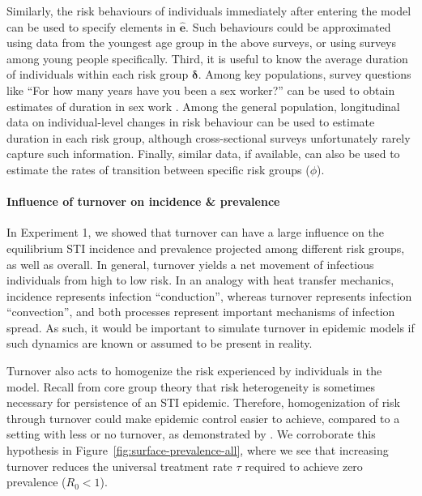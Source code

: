 Similarly, the risk behaviours of individuals immediately after entering the model
can be used to specify elements in $\bm{\hat{e}}$.
Such behaviours could be approximated using data from the youngest age group
in the above surveys,
or using surveys among young people specifically.
Third, it is useful to know the average duration of individuals within each risk group $\bm{\delta}$.
Among key populations, survey questions like
``For how many years have you been a sex worker?''
can be used to obtain estimates of duration in sex work \citep{Watts2010}.
Among the general population,
longitudinal data on individual-level changes in risk behaviour
can be used to estimate duration in each risk group,
although cross-sectional surveys unfortunately rarely capture such information.
Finally, similar data, if available, can also be used to estimate
the rates of transition between specific risk groups ($\phi$).
\paragraph{Influence of turnover on incidence \& prevalence}
In Experiment 1, we showed that turnover can have a large influence on
the equilibrium STI incidence and prevalence
projected among different risk groups, as well as overall.
In general, turnover yields a net movement of infectious individuals
from high to low risk.
In an analogy with heat transfer mechanics,
incidence represents infection ``conduction'',
whereas turnover represents infection ``convection'',
and both processes represent important mechanisms of infection spread.
As such, it would be important to simulate turnover in epidemic models
if such dynamics are known or assumed to be present in reality.
\par
Turnover also acts to homogenize the risk experienced by individuals in the model.
Recall from core group theory that
risk heterogeneity is sometimes necessary for persistence of an STI epidemic.
Therefore, homogenization of risk through turnover
could make epidemic control easier to achieve,
compared to a setting with less or no turnover,
as demonstrated by \citet{Henry2015}.
We corroborate this hypothesis in Figure~\ref{fig:surface-prevalence-all},
where we see that increasing turnover reduces
the universal treatment rate $\tau$ required to achieve zero prevalence ($R_0 < 1$).
